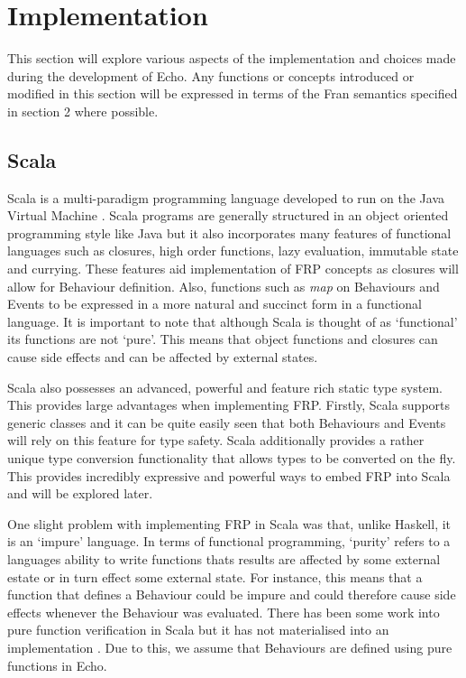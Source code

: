 \chapter{Implementation}
  This section will explore various aspects of the implementation and choices made during the development
  of Echo. Any functions or concepts introduced or modified in this section will be expressed in terms
  of the Fran semantics specified in section 2 where possible.
  
  \section{Scala}
    Scala is a multi-paradigm programming language developed to run on the Java Virtual Machine \cite{Odersky2004}. Scala 
    programs are
    generally structured in an object oriented programming style like Java but it also incorporates many features of
    functional languages such as closures, high order functions, lazy evaluation, immutable state and currying. These 
    features 
    aid
    implementation of FRP concepts as closures will allow for Behaviour definition. Also, functions such as \emph{map} on
    Behaviours and Events to be expressed in a more natural and succinct form in a functional language. It is
    important to note that although Scala is thought of as `functional' its functions are not `pure'. This means
    that object functions and closures can cause side effects and can be affected by external states.

    Scala also possesses an advanced, powerful and feature rich static type system. This provides large
    advantages when implementing FRP. Firstly, Scala supports generic classes and it can be quite easily seen
    that both Behaviours and Events will rely on this feature for type safety. Scala additionally provides
    a rather unique type conversion functionality that allows types to be converted on the fly. This provides
    incredibly expressive and powerful ways to embed FRP into Scala and will be explored later.
    
    One slight problem with implementing FRP in Scala was that, unlike Haskell, it is an `impure'
    language. In terms of functional programming, `purity' refers to a languages ability to write functions
    thats results are affected by some external estate or in turn effect some external state. For instance,
    this means that a function that defines a Behaviour could be impure and could therefore cause side effects
    whenever the Behaviour was evaluated. There has been some work into pure function verification in Scala but it has not materialised into an  
    implementation \cite{Nordenberg}. Due to this, we assume that Behaviours are defined using pure functions in Echo.

